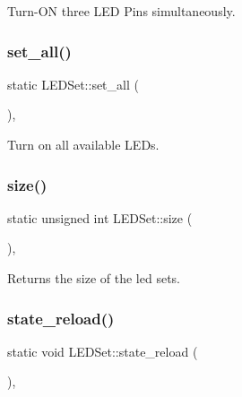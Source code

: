 Turn-\/\+ON three L\+ED Pins simultaneously. 

\mbox{\label{classLEDSet_a978f9404d139d17458d51fd05c5d7466}} 
\subsubsection{\texorpdfstring{set\+\_\+all()}{set\_all()}}
{\footnotesize\ttfamily static L\+E\+D\+Set\+::set\+\_\+all (\begin{DoxyParamCaption}{ }\end{DoxyParamCaption})\hspace{0.3cm}{\ttfamily [inline]}, {\ttfamily [static]}}



Turn on all available L\+E\+Ds. 

\mbox{\label{classLEDSet_a090860287fc0ce0d09e2b3c6d4399005}} 
\subsubsection{\texorpdfstring{size()}{size()}}
{\footnotesize\ttfamily static unsigned int L\+E\+D\+Set\+::size (\begin{DoxyParamCaption}{ }\end{DoxyParamCaption})\hspace{0.3cm}{\ttfamily [inline]}, {\ttfamily [static]}}



Returns the size of the led sets. 

\mbox{\label{classLEDSet_a1cb98a2a56113493121873f294dbd35a}} 
\subsubsection{\texorpdfstring{state\+\_\+reload()}{state\_reload()}}
{\footnotesize\ttfamily static void L\+E\+D\+Set\+::state\+\_\+reload (\begin{DoxyParamCaption}{ }\end{DoxyParamCaption})\hspace{0.3cm}{\ttfamily [inline]}, {\ttfamily [static]}}



